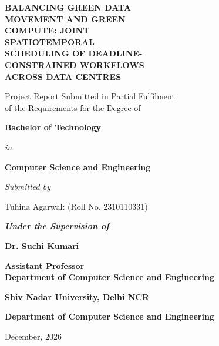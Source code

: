 \documentclass[12pt,a4paper,oneside,openany]{report}
\begin{document}
\begin{titlepage}
\singlespacing
\centering
\vspace*{-1cm}
{\fontsize{24}{30}\selectfont\bfseries
BALANCING GREEN DATA\\
MOVEMENT AND GREEN\\
COMPUTE: JOINT\\
SPATIOTEMPORAL\\
SCHEDULING OF DEADLINE-\\
CONSTRAINED WORKFLOWS\\
ACROSS DATA CENTRES\par}
\vfill
{\large Project Report Submitted in Partial Fulfilment\\ of the Requirements for the Degree of\par}
\vspace{0.5cm}
{\Large\bfseries Bachelor of Technology\par}
\vspace{0.1cm}
{\large\itshape in\par}
\vspace{0.1cm}
{\Large\bfseries Computer Science and Engineering\par}
\vfill
{\large\itshape Submitted by\par}
\vspace{0.2cm}
{\large Tuhina Agarwal: (Roll No. 2310110331)\par}
\vfill
{\large\bfseries\itshape Under the Supervision of\par}
\vspace{0.2cm}
{\large\bfseries Dr. Suchi Kumari\par}
{\large\bfseries Assistant Professor\\ Department of Computer Science and Engineering\par}
\vfill
{\large\bfseries Shiv Nadar University, Delhi NCR\par}
\vspace{0.1cm}
{\large\bfseries Department of Computer Science and Engineering\par}
\vspace{0.1cm}
{\large December, 2026\par}
\end{titlepage}
\restoregeometry

\setcounter{page}{1}

\end{document}
